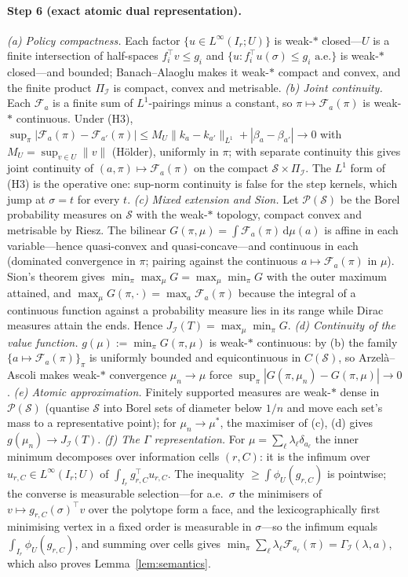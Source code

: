 \documentclass[11pt,a4paper]{article}
\theoremstyle{plain}
\theoremstyle{definition}
\theoremstyle{remark}
\newcommand{\calI}{\mathcal{I}}
\newcommand{\calP}{\mathcal{P}}
\newcommand{\calF}{\mathcal{F}}
\newcommand{\calS}{\mathscr{S}}
\newcommand{\Pol}{\Pi_{\calI}}
\newcommand{\J}{J_{\calI}(T)}
\newcommand{\Gam}{\Gamma_{\calI}}
\newcommand{\dd}{\,\mathrm{d}}
\begin{document}
\paragraph{Step 6 (exact atomic dual representation).}
\emph{(a) Policy compactness.} Each factor $\{u\in L^\infty(I_r;U)\}$ is weak-$\ast$ closed---$U$ is a finite intersection of half-spaces $f_i^\top v\le g_i$ and $\{u:f_i^\top u(\sigma)\le g_i\text{ a.e.}\}$ is weak-$\ast$ closed---and bounded; Banach--Alaoglu makes it weak-$\ast$ compact and convex, and the finite product $\Pol$ is compact, convex and metrisable.
\emph{(b) Joint continuity.} Each $\calF_a$ is a finite sum of $L^1$-pairings minus a constant, so $\pi\mapsto\calF_a(\pi)$ is weak-$\ast$ continuous. Under (H3), $\sup_\pi|\calF_a(\pi)-\calF_{a'}(\pi)|\le M_U\|k_a-k_{a'}\|_{L^1}+|\beta_a-\beta_{a'}|\to0$ with $M_U=\sup_{v\in U}\|v\|$ (H\"older), uniformly in $\pi$; with separate continuity this gives joint continuity of $(a,\pi)\mapsto\calF_a(\pi)$ on the compact $\calS\times\Pol$. The $L^1$ form of (H3) is the operative one: sup-norm continuity is false for the step kernels, which jump at $\sigma=t$ for every $t$.
\emph{(c) Mixed extension and Sion.} Let $\calP(\calS)$ be the Borel probability measures on $\calS$ with the weak-$\ast$ topology, compact convex and metrisable by Riesz. The bilinear $G(\pi,\mu)=\int\calF_a(\pi)\dd\mu(a)$ is affine in each variable---hence quasi-convex and quasi-concave---and continuous in each (dominated convergence in $\pi$; pairing against the continuous $a\mapsto\calF_a(\pi)$ in $\mu$). Sion's theorem \cite{Sion1958} gives $\min_\pi\max_\mu G=\max_\mu\min_\pi G$ with the outer maximum attained, and $\max_\mu G(\pi,\cdot)=\max_a\calF_a(\pi)$ because the integral of a continuous function against a probability measure lies in its range while Dirac measures attain the ends. Hence $\J=\max_\mu\min_\pi G$.
\emph{(d) Continuity of the value function.} $g(\mu):=\min_\pi G(\pi,\mu)$ is weak-$\ast$ continuous: by (b) the family $\{a\mapsto\calF_a(\pi)\}_\pi$ is uniformly bounded and equicontinuous in $C(\calS)$, so Arzel\`a--Ascoli makes weak-$\ast$ convergence $\mu_n\to\mu$ force $\sup_\pi|G(\pi,\mu_n)-G(\pi,\mu)|\to0$.
\emph{(e) Atomic approximation.} Finitely supported measures are weak-$\ast$ dense in $\calP(\calS)$ (quantise $\calS$ into Borel sets of diameter below $1/n$ and move each set's mass to a representative point); for $\mu_n\to\mu^\ast$, the maximiser of (c), (d) gives $g(\mu_n)\to\J$.
\emph{(f) The $\Gamma$ representation.} For $\mu=\sum_\ell\lambda_\ell\delta_{a_\ell}$ the inner minimum decomposes over information cells $(r,C)$: it is the infimum over $u_{r,C}\in L^\infty(I_r;U)$ of $\int_{I_r}g_{r,C}^\top u_{r,C}$. The inequality $\ge\int\phi_U(g_{r,C})$ is pointwise; the converse is measurable selection---for a.e.\ $\sigma$ the minimisers of $v\mapsto g_{r,C}(\sigma)^\top v$ over the polytope form a face, and the lexicographically first minimising vertex in a fixed order is measurable in $\sigma$---so the infimum equals $\int_{I_r}\phi_U(g_{r,C})$, and summing over cells gives $\min_\pi\sum_\ell\lambda_\ell\calF_{a_\ell}(\pi)=\Gam(\lambda,a)$, which also proves Lemma~\ref{lem:semantics}.
\end{document}
